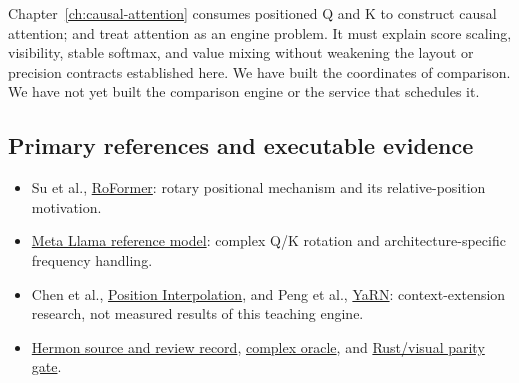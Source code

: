 Chapter~\ref{ch:causal-attention} consumes positioned Q and K to construct causal
attention;  and  treat attention
as an engine problem. It must explain score scaling, visibility, stable softmax,
and value mixing without weakening the layout or precision contracts
established here. We have built the coordinates of comparison. We have
not yet built the comparison engine or the service that schedules it.

\subsection{Primary references and executable
evidence}\label{primary-references-and-executable-evidence}

\begin{itemize}
\tightlist
\item
  Su et al., \href{https://arxiv.org/html/2104.09864v5}{RoFormer}:
  rotary positional mechanism and its relative-position motivation.
\item
  \href{https://raw.githubusercontent.com/meta-llama/llama-models/main/models/llama3/model.py}{Meta
  Llama reference model}: complex Q/K rotation and architecture-specific
  frequency handling.
\item
  Chen et al., \href{https://arxiv.org/abs/2306.15595}{Position
  Interpolation}, and Peng et al.,
  \href{https://arxiv.org/abs/2309.00071}{YaRN}: context-extension
  research, not measured results of this teaching engine.
\item
  \href{https://github.com/hermonai/inside-the-llm-engine/blob/astra-visual-rewrite/research/part-02/chapter-09-position-rope.md}{Hermon
  source and review record},
  \href{https://github.com/hermonai/inside-the-llm-engine/blob/astra-visual-rewrite/code/reference/python/chapter09_rope_oracle.py}{complex
  oracle}, and
  \href{https://github.com/hermonai/inside-the-llm-engine/blob/astra-visual-rewrite/scripts/check-rope-visual-parity.py}{Rust/visual
  parity gate}.
\end{itemize}

